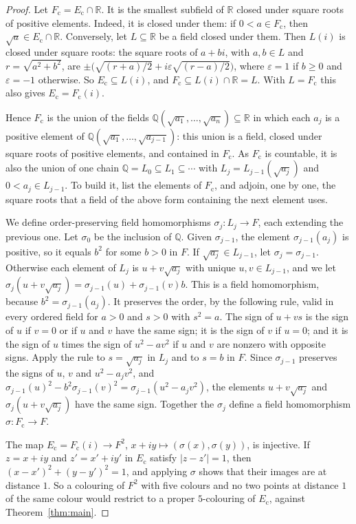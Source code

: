 \documentclass[11pt,a4paper]{amsart}
\theoremstyle{remark}
\newcommand{\Q}{\mathbb{Q}}
\newcommand{\R}{\mathbb{R}}
\newcommand{\Ec}{E_{\mathrm{c}}}
\begin{document}
\begin{proof}
Let $F_{\mathrm c}=\Ec\cap\R$. It is the smallest subfield of $\R$ closed under square roots of positive elements.
Indeed, it is closed under them: if $0<a\in F_{\mathrm c}$, then $\sqrt a\in\Ec\cap\R$. Conversely, let $L\subseteq\R$ be a field closed under them. Then $L(i)$ is closed
under square roots: the square roots of $a+bi$, with $a,b\in L$ and $r=\sqrt{a^2+b^2}$, are
$\pm\bigl(\sqrt{(r+a)/2}+i\varepsilon\sqrt{(r-a)/2}\bigr)$, where $\varepsilon=1$ if $b\ge0$ and $\varepsilon=-1$
otherwise. So $\Ec\subseteq L(i)$, and $F_{\mathrm c}\subseteq L(i)\cap\R=L$. With $L=F_{\mathrm c}$
this also gives $\Ec=F_{\mathrm c}(i)$.

Hence $F_{\mathrm c}$ is the union of the fields $\Q(\sqrt{a_1},\dots,\sqrt{a_n})\subseteq\R$ in which each $a_j$ is
a positive element of $\Q(\sqrt{a_1},\dots,\sqrt{a_{j-1}})$: this union is a field, closed under square roots of
positive elements, and contained in $F_{\mathrm c}$. As $F_{\mathrm c}$ is countable, it is also the union of one chain
$\Q=L_0\subseteq L_1\subseteq\cdots$ with $L_j=L_{j-1}(\sqrt{a_j})$ and $0<a_j\in L_{j-1}$. To build it, list the
elements of $F_{\mathrm c}$, and adjoin, one by one, the square roots that a field of the above form containing the
next element uses.

We define order-preserving field homomorphisms $\sigma_j\colon L_j\to F$, each extending the previous one. Let
$\sigma_0$ be the inclusion of $\Q$. Given $\sigma_{j-1}$, the element $\sigma_{j-1}(a_j)$ is positive, so it equals
$b^2$ for some $b>0$ in $F$. If $\sqrt{a_j}\in L_{j-1}$, let $\sigma_j=\sigma_{j-1}$. Otherwise each element of $L_j$
is $u+v\sqrt{a_j}$ with unique $u,v\in L_{j-1}$, and we let $\sigma_j(u+v\sqrt{a_j})=\sigma_{j-1}(u)+\sigma_{j-1}(v)b$.
This is a field homomorphism, because $b^2=\sigma_{j-1}(a_j)$. It preserves the order, by the following rule,
valid in every ordered field for $a>0$ and $s>0$ with $s^2=a$. The sign of $u+vs$ is the sign of $u$ if $v=0$ or if
$u$ and $v$ have the same sign; it is the sign of $v$ if $u=0$; and it is the sign of $u$ times the sign of
$u^2-av^2$ if $u$ and $v$ are nonzero with opposite signs. Apply the rule to $s=\sqrt{a_j}$ in $L_j$ and to $s=b$ in
$F$. Since $\sigma_{j-1}$ preserves the signs of $u$, $v$ and $u^2-a_jv^2$, and
$\sigma_{j-1}(u)^2-b^2\sigma_{j-1}(v)^2=\sigma_{j-1}(u^2-a_jv^2)$, the elements $u+v\sqrt{a_j}$ and
$\sigma_j(u+v\sqrt{a_j})$ have the same sign. Together the $\sigma_j$ define a field homomorphism $\sigma\colon F_{\mathrm c}\to F$.

The map $\Ec=F_{\mathrm c}(i)\to F^2$, $x+iy\mapsto(\sigma(x),\sigma(y))$, is injective. If $z=x+iy$ and $z'=x'+iy'$
in $\Ec$ satisfy $|z-z'|=1$, then $(x-x')^2+(y-y')^2=1$, and applying $\sigma$ shows that their images are at
distance $1$. So a colouring of $F^2$ with five colours and no two points at distance $1$ of the same colour would
restrict to a proper $5$-colouring of $\Ec$, against Theorem~\ref{thm:main}.
\end{proof}
\end{document}
